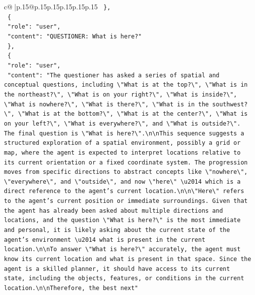 \documentclass{article}
\begin{document}
{\begin{supertabular}{c@{$\;$}|p{.15\linewidth}@{}p{.15\linewidth}p{.15\linewidth}p{.15\linewidth}p{.15\linewidth}p{.15\linewidth}}
{{{\texttt{  \},} \\
\texttt{  \{} \\
\texttt{    "role": "user",} \\
\texttt{    "content": "QUESTIONER: What is here?"} \\
\texttt{  \},} \\
\texttt{  \{} \\
\texttt{    "role": "user",} \\
\texttt{    "content": "The questioner has asked a series of spatial and conceptual questions, including \textbackslash{}"What is at the top?\textbackslash{}", \textbackslash{}"What is in the northeast?\textbackslash{}", \textbackslash{}"What is on your right?\textbackslash{}", \textbackslash{}"What is inside?\textbackslash{}", \textbackslash{}"What is nowhere?\textbackslash{}", \textbackslash{}"What is there?\textbackslash{}", \textbackslash{}"What is in the southwest?\textbackslash{}", \textbackslash{}"What is at the bottom?\textbackslash{}", \textbackslash{}"What is at the center?\textbackslash{}", \textbackslash{}"What is on your left?\textbackslash{}", \textbackslash{}"What is everywhere?\textbackslash{}", and \textbackslash{}"What is outside?\textbackslash{}". The final question is \textbackslash{}"What is here?\textbackslash{}".\textbackslash{}n\textbackslash{}nThis sequence suggests a structured exploration of a spatial environment, possibly a grid or map, where the agent is expected to interpret locations relative to its current orientation or a fixed coordinate system. The progression moves from specific directions to abstract concepts like \textbackslash{}"nowhere\textbackslash{}", \textbackslash{}"everywhere\textbackslash{}", and \textbackslash{}"outside\textbackslash{}", and now \textbackslash{}"here\textbackslash{}" \textbackslash{}u2014 which is a direct reference to the agent's current location.\textbackslash{}n\textbackslash{}n\textbackslash{}"Here\textbackslash{}" refers to the agent's current position or immediate surroundings. Given that the agent has already been asked about multiple directions and locations, and the question \textbackslash{}"What is here?\textbackslash{}" is the most immediate and personal, it is likely asking about the current state of the agent's environment \textbackslash{}u2014 what is present in the current location.\textbackslash{}n\textbackslash{}nTo answer \textbackslash{}"What is here?\textbackslash{}" accurately, the agent must know its current location and what is present in that space. Since the agent is a skilled planner, it should have access to its current state, including the objects, features, or conditions in the current location.\textbackslash{}n\textbackslash{}nTherefore, the best next"} \\
}}}
\end{supertabular}}
\end{document}
